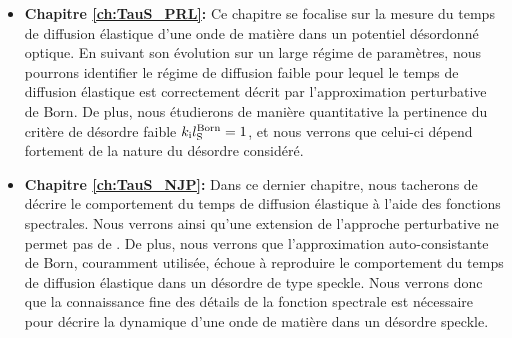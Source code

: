 \begin{itemize}
\item[\textendash] \textbf{Chapitre \ref{ch:TauS_PRL}:} Ce chapitre se focalise sur la mesure du temps de diffusion élastique d'une onde de matière dans un potentiel désordonné optique. En suivant son évolution sur un large régime de paramètres, nous pourrons identifier le régime de diffusion faible pour lequel le temps de diffusion élastique est correctement décrit par l'approximation perturbative de Born. De plus, nous étudierons de manière quantitative la pertinence du critère de désordre faible $k_{\mathrm{i}}l_{\mathrm{S}}^{\mathrm{Born}}=1$, et nous verrons que celui-ci dépend fortement de la nature du désordre considéré. \\

\item[\textendash] \textbf{Chapitre \ref{ch:TauS_NJP}:} Dans ce dernier chapitre, nous tacherons de décrire le comportement du temps de diffusion élastique à l'aide des fonctions spectrales. Nous verrons ainsi qu'une extension de l'approche perturbative ne permet pas de . De plus, nous verrons que l'approximation auto-consistante de Born, couramment utilisée, échoue à reproduire le comportement du temps de diffusion élastique dans un désordre de type speckle. Nous verrons donc que la connaissance fine des détails de la fonction spectrale est nécessaire pour décrire la dynamique d'une onde de matière dans un désordre speckle.
\end{itemize}



